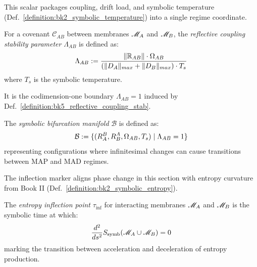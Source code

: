 \begin{definition} \label{definition:bk5_reflective_coupling_stab} 
This scalar packages coupling, drift load, and symbolic temperature (Def.~\ref{definition:bk2_symbolic_temperature}) into a single regime coordinate.

For a covenant $\mathcal{C}_{AB}$ between membranes $\mathscr{M}_A$ and $\mathscr{M}_B$, the \emph{reflective coupling stability parameter} $\Lambda_{AB}$ is defined as:
\begin{equation}
\Lambda_{AB} := \frac{\|\mathbb{R}_{AB}\| \cdot \Omega_{AB}}{(\|D_A\|_{max} + \|D_B\|_{max}) \cdot T_s}
\end{equation}
\noindent where $T_s$ is the symbolic temperature.
\end{definition}
\begin{definition} \label{definition:bk5_symbolic_bifurcation_man} 
It is the codimension-one boundary $\Lambda_{AB}=1$ induced by Def.~\ref{definition:bk5_reflective_coupling_stab}.

The \emph{symbolic bifurcation manifold} $\mathcal{B}$ is defined as:
\begin{equation}
\mathcal{B} := \{(R_A^B, R_B^A, \Omega_{AB}, T_s) \mid \Lambda_{AB} = 1 \}
\end{equation}
\noindent representing configurations where infinitesimal changes can cause transitions between MAP and MAD regimes.
\end{definition}
\begin{definition} \label{definition:bk5_entropy_inflection_point} 
The inflection marker aligns phase change in this section with entropy curvature from Book II (Def.~\ref{definition:bk2_symbolic_entropy}).

The \emph{entropy inflection point} $\tau_{\text{inf}}$ for interacting membranes $\mathscr{M}_A$ and $\mathscr{M}_B$ is the symbolic time at which:
\begin{equation}
\frac{d^2}{ds^2}S_{\text{symb}}(\mathscr{M}_A \cup \mathscr{M}_B) = 0
\end{equation}
\noindent marking the transition between acceleration and deceleration of entropy production.
\end{definition}
